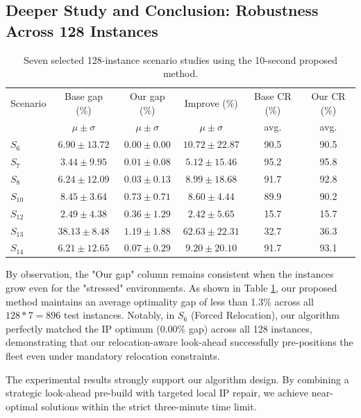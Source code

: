 \documentclass[10pt,a4paper]{article}
\begin{document}
\subsection*{Deeper Study and Conclusion: Robustness Across 128 Instances}

\begin{table}[h]
\centering
\caption{Seven selected 128-instance scenario studies using the 10-second proposed method.}
\label{tab:robustness}
\small
\begin{tabular}{lccc|cc}
\hline
Scenario & Base gap (\%) & Our gap (\%) & Improve (\%) & Base CR (\%) & Our CR (\%) \\
& $\mu \pm \sigma$ & $\mu \pm \sigma$ & $\mu \pm \sigma$ & avg. & avg. \\ \hline
$S_6$ & $6.90 \pm 13.72$ & $0.00 \pm 0.00$ & $10.72 \pm 22.87$ & 90.5 & 90.5 \\
$S_7$ & $3.44 \pm 9.95$ & $0.01 \pm 0.08$ & $5.12 \pm 15.46$ & 95.2 & 95.8 \\
$S_8$ & $6.24 \pm 12.09$ & $0.03 \pm 0.13$ & $8.99 \pm 18.68$ & 91.7 & 92.8 \\
$S_{10}$ & $8.45 \pm 3.64$ & $0.73 \pm 0.71$ & $8.60 \pm 4.44$ & 89.9 & 90.2 \\
$S_{12}$ & $2.49 \pm 4.38$ & $0.36 \pm 1.29$ & $2.42 \pm 5.65$ & 15.7 & 15.7 \\
$S_{13}$ & $38.13 \pm 8.48$ & $1.19 \pm 1.88$ & $62.63 \pm 22.31$ & 32.7 & 36.3 \\
$S_{14}$ & $6.21 \pm 12.65$ & $0.07 \pm 0.29$ & $9.20 \pm 20.10$ & 91.7 & 93.1 \\ \hline
\end{tabular}
\end{table}

By observation, the "Our gap" column remains consistent when the instances grow even for the "stressed" environments. As shown in Table \ref{tab:robustness}, our proposed method maintains an average optimality gap of less than 1.3\% across all $128*7=896$ test instances. Notably, in $S_6$ (Forced Relocation), our algorithm perfectly matched the IP optimum ($0.00\%$ gap) across all 128 instances, demonstrating that our relocation-aware look-ahead successfully pre-positions the fleet even under mandatory relocation constraints.

\vspace{0.2cm}
The experimental results strongly support our algorithm design. By combining a strategic look-ahead pre-build with targeted local IP repair, we achieve near-optimal solutions within the strict three-minute time limit.
\end{document}
